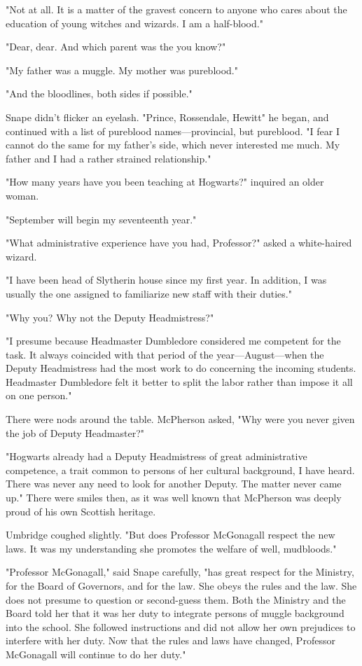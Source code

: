 "Not at all. It is a matter of the gravest concern to anyone who cares about the education of young witches and wizards. I am a half-blood."

"Dear, dear. And which parent was the{\el} you know?"

"My father was a muggle. My mother was pureblood."

"And the bloodlines, both sides if possible."

Snape didn't flicker an eyelash. "Prince, Rossendale, Hewitt{\el}" he began, and continued with a list of pureblood names—provincial, but pureblood. "I fear I cannot do the same for my father's side, which never interested me much. My father and I had a rather strained relationship."

"How many years have you been teaching at Hogwarts?" inquired an older woman.

"September will begin my seventeenth year."

"What administrative experience have you had, Professor?" asked a white-haired wizard.

"I have been head of Slytherin house since my first year. In addition, I was usually the one assigned to familiarize new staff with their duties."

"Why you? Why not the Deputy Headmistress?"

"I presume because Headmaster Dumbledore considered me competent for the task. It always coincided with that period of the year—August—when the Deputy Headmistress had the most work to do concerning the incoming students. Headmaster Dumbledore felt it better to split the labor rather than impose it all on one person."

There were nods around the table. McPherson asked, "Why were you never given the job of Deputy Headmaster?"

"Hogwarts already had a Deputy Headmistress of great administrative competence, a trait common to persons of her cultural background, I have heard. There was never any need to look for another Deputy. The matter never came up." There were smiles then, as it was well known that McPherson was deeply proud of his own Scottish heritage.

Umbridge coughed slightly. "But does Professor McGonagall respect the new laws. It was my understanding she promotes the welfare of{\el} well, mudbloods."

"Professor McGonagall," said Snape carefully, "has great respect for the Ministry, for the Board of Governors, and for the law. She obeys the rules and the law. She does not presume to question or second-guess them. Both the Ministry and the Board told her that it was her duty to integrate persons of muggle background into the school. She followed instructions and did not allow her own prejudices to interfere with her duty. Now that the rules and laws have changed, Professor McGonagall will continue to do her duty."

